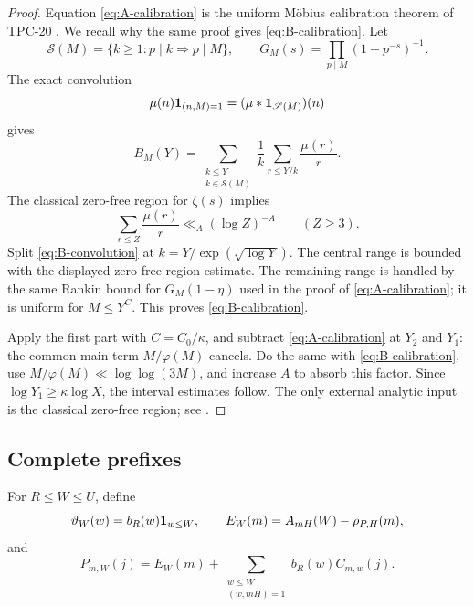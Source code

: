 \begin{proof}
Equation \eqref{eq:A-calibration} is the uniform M\"obius calibration
theorem of TPC-20 \citep{WangTPC20}.  We recall why the same proof gives
\eqref{eq:B-calibration}.  Let
\[
 \mathscr S(M)=\{k\ge1:p\mid k\Longrightarrow p\mid M\},
 \qquad
 G_M(s)=\prod_{p\mid M}(1-p^{-s})^{-1}.
\]
The exact convolution
\[
 \mu(n)\mathbf 1_{(n,M)=1}=(\mu*\mathbf 1_{\mathscr S(M)})(n)
\]
gives
\begin{equation}
 B_M(Y)=
 \sum_{\substack{k\le Y\\k\in\mathscr S(M)}}
 \frac1k
 \sum_{r\le Y/k}\frac{\mu(r)}r.
 \label{eq:B-convolution}
\end{equation}
The classical zero-free region for \(\zeta(s)\) implies
\[
 \sum_{r\le Z}\frac{\mu(r)}r\ll_A(\log Z)^{-A}
 \qquad(Z\ge3).
\]
Split \eqref{eq:B-convolution} at
\(k=Y/\exp(\sqrt{\log Y})\).  The central range is bounded with the
displayed zero-free-region estimate.  The remaining range is handled
by the same Rankin bound for \(G_M(1-\eta)\) used in the proof of
\eqref{eq:A-calibration}; it is uniform for \(M\le Y^C\).
This proves \eqref{eq:B-calibration}.

Apply the first part with \(C=C_0/\kappa\), and subtract
\eqref{eq:A-calibration} at \(Y_2\) and \(Y_1\): the common
main term \(M/\varphi(M)\) cancels.  Do the same with
\eqref{eq:B-calibration}, use
\(M/\varphi(M)\ll\log\log(3M)\), and increase \(A\) to absorb this
factor.  Since \(\log Y_1\ge\kappa\log X\), the interval estimates
follow.  The only external analytic input is the classical zero-free
region; see \citet[Chapter~5]{IwaniecKowalski2004}.
\end{proof}

\subsection{Complete prefixes}

For \(R\le W\le U\), define
\begin{equation}
 \vartheta_W(w)=b_R(w)\mathbf 1_{w\le W},
 \qquad
 E_W(m)=A_{mH}(W)-\rho_{P,H}(m),
 \label{eq:theta-E}
\end{equation}
and
\begin{equation}
 P_{m,W}(j)=
 E_W(m)+
 \sum_{\substack{w\le W\\(w,mH)=1}}
 b_R(w)C_{m,w}(j).
 \label{eq:calibrated-prefix}
\end{equation}

